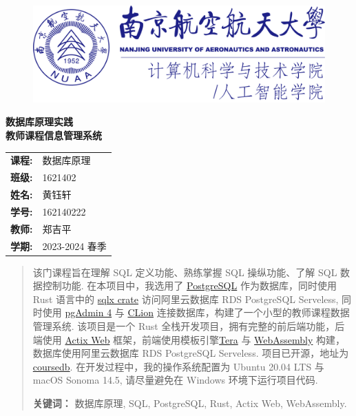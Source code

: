 \documentclass[12pt, oneside]{ctexart}
\numberwithin{figure}{section}
\numberwithin{table}{section}
\begin{document}
\thispagestyle{empty}

\begin{figure}[t]
    \centering
    \includegraphics[width=13cm]{images/logo.png}
\end{figure}

\vspace*{\fill}
    \begin{center}
        \Huge\textbf{数据库原理实践 \\ 教师课程信息管理系统}
    \end{center}
\vspace*{\fill}

\begin{table}[b]
    \centering
    \large
    \begin{tabular}{ll}
    \textbf{课程:} & 数据库原理 \\
    \textbf{班级:} & 1621402 \\
    \textbf{姓名:} & 黄钰轩 \\
    \textbf{学号:} & 162140222 \\
    \textbf{教师:} & 郑吉平 \\
    \textbf{学期:} & 2023-2024 春季 \\
    \end{tabular}
\end{table}

\newpage

\thispagestyle{empty}
\begin{abstract}
    该门课程旨在理解 SQL 定义功能、熟练掌握 SQL 操纵功能、了解 SQL 数据控制功能. 在本项目中，我选用了 \href{https://www.postgresql.org/}{PostgreSQL} 作为数据库，同时使用 Rust 语言中的 \href{https://crates.io/crates/sqlx}{sqlx crate} 访问阿里云数据库 RDS PostgreSQL Serveless, 同时使用 \href{https://www.pgadmin.org/}{pgAdmin 4} 与 \href{https://www.jetbrains.com/clion/}{CLion} 连接数据库，构建了一个小型的教师课程数据管理系统. 该项目是一个 Rust 全栈开发项目，拥有完整的前后端功能，后端使用 \href{https://actix.rs/}{Actix Web} 框架，前端使用模板引擎\href{https://keats.github.io/tera/}{Tera} 与 \href{https://www.rust-lang.org/what/wasm}{Web­Assembly} 构建，数据库使用阿里云数据库 RDS PostgreSQL Serveless. 项目已开源，地址为 \href{https://github.com/Cresc3ntRose/coursedb}{coursedb}. 在开发过程中，我的操作系统配置为 Ubuntu 20.04 LTS 与 macOS Sonoma 14.5, 请尽量避免在 Windows 环境下运行项目代码.
    \par\textbf{关键词：} 数据库原理, SQL, PostgreSQL, Rust, Actix Web, Web­Assembly.
\end{abstract}
\end{document}

